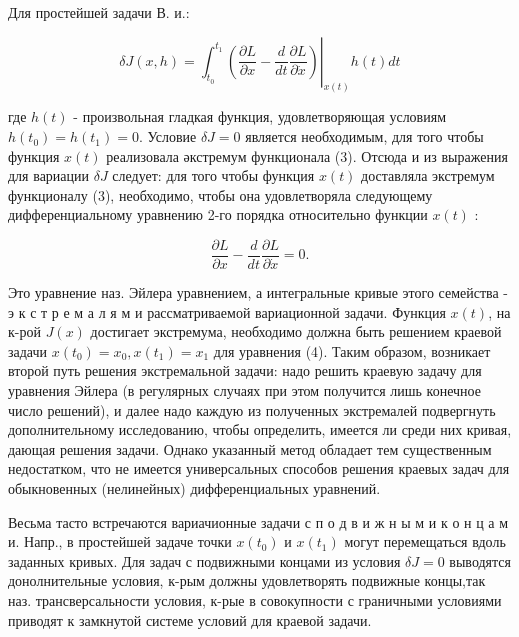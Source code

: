 \documentclass[10pt]{article}
\begin{document}
Для простейшей задачи В. и.:



\[

\delta J(x, h)=\left.\int_{t_{0}}^{t_{1}}\left(\frac{\partial L}{\partial x}-\frac{d}{d t} \frac{\partial L}{\partial \dot{x}}\right)\right|_{x(t)} h(t) d t

\]



где $h(t)$ - произвольная гладкая функция, удовлетворяющая условиям $h\left(t_{0}\right)=h\left(t_{1}\right)=0$. Условие $\delta J=0$ является необходимым, для того чтобы функция $x(t)$ реализовала әкстремум функционала (3). Отсюда и из выражения для вариации $\delta J$ следует: для того чтобы функция $x(t)$ доставляла экстремум функционалу (3), необходимо, чтобы она удовлетворяла следующему дифференциальному уравнению 2-го порядка относительно функции $x(t)$ :



\[

\frac{\partial L}{\partial x}-\frac{d}{d t} \frac{\partial L}{\partial \dot{x}}=0 .

\]



Это уравнение наз. Эйлера уравнением, а интегральные кривые этого семейства - э к с т р е м а л я м и рассматриваемой вариационной задачи. Функция $x(t)$, на к-рой $J(x)$ достигает экстремума, необходимо должна быть решением краевой задачи $x\left(t_{0}\right)=x_{0}, x\left(t_{1}\right)=x_{1}$ для уравнения (4). Таким образом, возникает второй путь решения экстремальной задачи: надо решить краевую задачу для уравнения Эйлера (в регулярных случаях при этом получится лишь конечное число решений), и далее надо каждую из полученных экстремалей подвергнуть дополнительному исследованию, чтобы определить, имеется ли среди них кривая, дающая решения задачи. Однако указанный метод обладает тем существенным недостатком, что не имеется универсальных способов решения краевых задач для обыкновенных (нелинейных) дифференциальных уравнений.



Весьма тасто встречаются вариачионные задачи с п о д в и ж н ы м и к о н ц а м и. Напр., в простейшей задаче точки $x\left(t_{0}\right)$ и $x\left(t_{1}\right)$ могут перемещаться вдоль заданных кривых. Для задач с подвижными концами из условия $\delta J=0$ выводятся донолнительные условия, к-рым должны удовлетворять подвижные концы,так наз. трансверсальности условия, к-рые в совокупности с граничными условиями приводят к замкнутой системе условий для краевой задачи.
\end{document}
